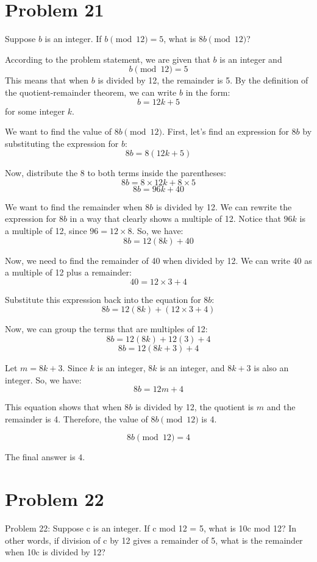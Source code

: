 \documentclass{article}
\begin{document}
\newpage

\section*{Problem 21}
Suppose $b$ is an integer. If $b \pmod{12} = 5$, what is $8b \pmod{12}$?

According to the problem statement, we are given that $b$ is an integer and
$$ b \pmod{12} = 5 $$
This means that when $b$ is divided by 12, the remainder is 5. By the definition of the quotient-remainder theorem, we can write $b$ in the form:
$$ b = 12k + 5 $$
for some integer $k$.

We want to find the value of $8b \pmod{12}$. First, let's find an expression for $8b$ by substituting the expression for $b$:
$$ 8b = 8(12k + 5) $$

Now, distribute the 8 to both terms inside the parentheses:
$$ 8b = 8 \times 12k + 8 \times 5 $$
$$ 8b = 96k + 40 $$

We want to find the remainder when $8b$ is divided by 12. We can rewrite the expression for $8b$ in a way that clearly shows a multiple of 12.
Notice that $96k$ is a multiple of 12, since $96 = 12 \times 8$. So, we have:
$$ 8b = 12(8k) + 40 $$

Now, we need to find the remainder of 40 when divided by 12. We can write 40 as a multiple of 12 plus a remainder:
$$ 40 = 12 \times 3 + 4 $$

Substitute this expression back into the equation for $8b$:
$$ 8b = 12(8k) + (12 \times 3 + 4) $$

Now, we can group the terms that are multiples of 12:
$$ 8b = 12(8k) + 12(3) + 4 $$
$$ 8b = 12(8k + 3) + 4 $$

Let $m = 8k + 3$. Since $k$ is an integer, $8k$ is an integer, and $8k + 3$ is also an integer. So, we have:
$$ 8b = 12m + 4 $$

This equation shows that when $8b$ is divided by 12, the quotient is $m$ and the remainder is 4.
Therefore, the value of $8b \pmod{12}$ is 4.

$$ 8b \pmod{12} = 4 $$

The final answer is $\boxed{4}$.

\newpage

\section*{Problem 22}
Problem 22: Suppose c is an integer. If c mod 12 = 5, what is 10c mod 12? In other words, if division of c by 12 gives a remainder of 5, what is the remainder when 10c is divided by 12?
\end{document}
